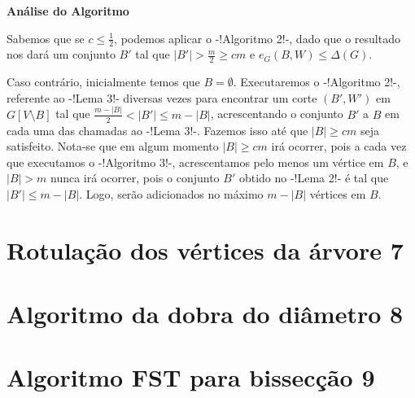 \documentclass[a4paper,12pt]{article}
\begin{document}
\bigskip
\bigskip

\textbf{Análise do Algoritmo}

	Sabemos que se $c \le \frac{1}{2}$, podemos aplicar o -!Algoritmo 2!-, 
	dado que o resultado nos dará um conjunto $B'$ tal que
	$|B'|>\frac{m}{2}\ge cm$ e $e_G(B,W)\le \Delta(G)$.

	Caso contrário, inicialmente temos que $B = \emptyset$.
	Executaremos o -!Algoritmo 2!-, referente ao -!Lema 3!- diversas vezes para 
	encontrar 
	um corte $(B',W')$ em $G[V\setminus B]$ tal que $\frac{m-|B|}{2}<|B'|\le m-|B|$,
	acrescentando o conjunto $B'$ a $B$ em cada uma das chamadas ao -!Lema 3!-.
	Fazemos isso até que $|B|\ge cm$ seja satisfeito.
	Nota-se que em algum momento $|B|\ge cm$ irá ocorrer, pois a cada vez
	que executamos o -!Algoritmo 3!-, acrescentamos pelo menos um vértice em $B$,
	e $|B|>m$ nunca irá ocorrer, pois o conjunto $B'$ obtido no -!Lema 2!- é
	tal que $|B'|\le m-|B|$. Logo, serão adicionados no máximo 
	$m-|B|$ vértices em $B$.

\newpage

\section {Rotulação dos vértices da árvore 7}


\section {Algoritmo da dobra do diâmetro 8}


\section {Algoritmo FST para bissecção 9}



\end{document}

